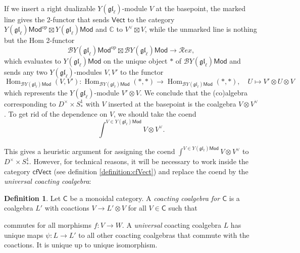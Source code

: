\documentclass[11pt]{report}
\theoremstyle{definition}
\newtheorem{definition}[theorem]{Definition}
\theoremstyle{remark}
\theoremstyle{remark}
\newcommand{\Hom}{\operatorname{Hom}}
\newcommand{\id}{\textnormal{id}}
\newcommand{\C}{\mathbb{C}}
\begin{document}
~\\
If we insert a right dualizable $Y(\mathfrak{gl}_\ell)$-module $V$ at the basepoint, the marked line gives the 2-functor that sends $\mathsf{Vect}$ to the category $Y(\mathfrak{gl}_\ell)\mathsf{Mod}^\text{op} \boxtimes Y(\mathfrak{gl}_\ell)\mathsf{Mod}$ and $\C$ to $V^\vee \boxtimes V$, while the unmarked line is nothing but the Hom 2-functor
\begin{equation*}
\mathcal{B}Y(\mathfrak{gl}_\ell)\mathsf{Mod}^\text{op} \boxtimes \mathcal{B}Y(\mathfrak{gl}_\ell)\mathsf{Mod} \to \mathcal{R}ex,
\end{equation*}
which evaluates to $Y(\mathfrak{gl}_\ell)\mathsf{Mod}$ on the unique object $*$ of $\mathcal{B}Y(\mathfrak{gl}_\ell)\mathsf{Mod}$ and sends any two $Y(\mathfrak{gl}_\ell)$-modules $V,V'$ to the functor
\begin{equation*}
\Hom_{\mathcal{B}Y(\mathfrak{gl}_\ell)\mathsf{Mod}}(V,V'): \Hom_{\mathcal{B}Y(\mathfrak{gl}_\ell)\mathsf{Mod}}(*,*) \to \Hom_{\mathcal{B}Y(\mathfrak{gl}_\ell)\mathsf{Mod}}(*,*), \quad U \mapsto V' \otimes U \otimes V
\end{equation*}
which represents the $Y(\mathfrak{gl}_\ell)$-module $V' \otimes V$. We conclude that the (co)algebra corresponding to $D^\times \times S_*^1$ with $V$ inserted at the basepoint is the coalgebra $V \otimes V^\vee$. To get rid of the dependence on $V$, we should take the coend
\begin{equation*}
\int^{V \in Y(\mathfrak{gl}_\ell)\mathsf{Mod}} V \otimes V^\vee.
\end{equation*}

This gives a heuristic argument for assigning the coend $\int^{V \in Y(\mathfrak{gl}_\ell)\mathsf{Mod}} V \otimes V^\vee$ to $D^\times \times S_*^1$. However, for technical reasons, it will be necessary to work inside the category $\mathsf{cfVect}$ (see definition \ref{definition:cfVect}) and replace the coend by the \emph{universal coacting coalgebra}:

\begin{definition}
Let $\mathsf{C}$ be a monoidal category. A \emph{coacting coalgebra for $\mathsf{C}$} is a coalgebra $L'$ with coactions $V \to L' \otimes V$ for all $V \in \mathsf{C}$ such that
\begin{center}
\end{center}
commutes for all morphisms $f: V \to W$. A \emph{universal} coacting coalgebra $L$ has unique maps $\psi: L \to L'$ to all other coacting coalgebras that commute with the coactions. It is unique up to unique isomorphism.
\end{definition}
\end{document}
